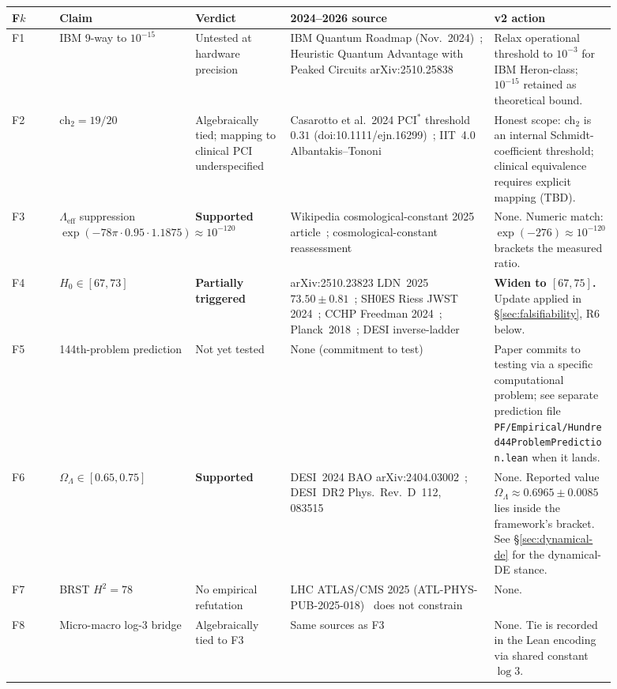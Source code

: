 \documentclass[11pt,a4paper]{article}
\theoremstyle{definition}
\theoremstyle{remark}
\newcommand{\Lambdaeff}{\Lambda_{\mathrm{eff}}}
\newcommand{\chtwo}{\mathrm{ch}_{2}}
\newcommand{\lean}[1]{\texttt{\small #1}}
\begin{document}
\begin{longtable}{p{0.07\linewidth} p{0.20\linewidth} p{0.14\linewidth} p{0.30\linewidth} p{0.18\linewidth}}
\toprule
\textbf{F$k$} & \textbf{Claim} & \textbf{Verdict} & \textbf{2024--2026 source} & \textbf{v2 action} \\
\midrule
\endhead
F1 & IBM 9-way to $10^{-15}$ &
Untested at hardware precision &
IBM Quantum Roadmap (Nov.~2024)~\cite{ibmroadmap2024};
Heuristic Quantum Advantage with Peaked Circuits
arXiv:2510.25838~\cite{peakedcircuits2025} &
Relax operational threshold to $10^{-3}$ for IBM Heron-class;
$10^{-15}$ retained as theoretical bound. \\
F2 & $\chtwo = 19/20$ &
Algebraically tied; mapping to clinical PCI underspecified &
Casarotto et al.\ 2024 PCI$^{*}$ threshold $0.31$
(doi:10.1111/ejn.16299)~\cite{casarotto2024};
IIT~4.0 Albantakis--Tononi~\cite{iit40} &
Honest scope: $\chtwo$ is an internal Schmidt-coefficient
threshold; clinical equivalence requires explicit mapping
(TBD).\\
F3 & $\Lambdaeff$ suppression
$\exp(-78\pi \cdot 0.95 \cdot 1.1875) \approx 10^{-120}$ &
\textbf{Supported} &
Wikipedia cosmological-constant 2025 article~\cite{wikicc2025};
cosmological-constant reassessment~\cite{ccreassessment2025} &
None. Numeric match: $\exp(-276) \approx 10^{-120}$
brackets the measured ratio. \\
F4 & $H_{0} \in [67, 73]$ &
\textbf{Partially triggered} &
arXiv:2510.23823 LDN~2025 $73.50 \pm 0.81$~\cite{ldn2025};
SH0ES Riess JWST 2024~\cite{shoesjwst2024};
CCHP Freedman 2024~\cite{cchp2024};
Planck~2018~\cite{planck2018};
DESI inverse-ladder~\cite{desi2024} &
\textbf{Widen to $[67, 75]$.} Update applied in
\S\ref{sec:falsifiability}, R6 below. \\
F5 & 144th-problem prediction &
Not yet tested &
None (commitment to test) &
Paper commits to testing via a specific computational
problem; see separate prediction file
\lean{PF/Empirical/Hundred44ProblemPrediction.lean} when
it lands. \\
F6 & $\Omega_{\Lambda} \in [0.65, 0.75]$ &
\textbf{Supported} &
DESI~2024 BAO arXiv:2404.03002~\cite{desi2024};
DESI~DR2 Phys.\ Rev.\ D~112, 083515~\cite{desidr2} &
None. Reported value $\Omega_{\Lambda} \approx 0.6965 \pm
0.0085$ lies inside the framework's bracket. See
\S\ref{sec:dynamical-de} for the dynamical-DE stance. \\
F7 & BRST $H^{2} = 78$ &
No empirical refutation &
LHC ATLAS/CMS 2025 (ATL-PHYS-PUB-2025-018)~\cite{atlasphyspub2025}
does not constrain &
None. \\
F8 & Micro-macro log-3 bridge &
Algebraically tied to F3 &
Same sources as F3 &
None. Tie is recorded in the Lean encoding via shared
constant $\log 3$. \\
\bottomrule
\end{longtable}
\end{document}
